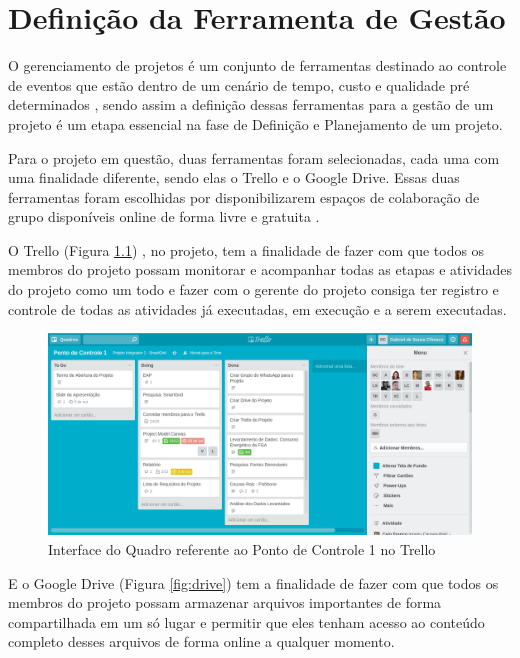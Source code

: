 \chapter[Definição da Ferramenta de Gestão]{Definição da Ferramenta de Gestão}

O gerenciamento de projetos é um conjunto de ferramentas destinado ao controle de eventos que estão dentro de um cenário de tempo, custo e qualidade pré determinados \cite{vargas2016gerenciamento}, sendo assim a definição dessas ferramentas para a gestão de um projeto é um etapa essencial na fase de Definição e Planejamento de um projeto.  

Para o projeto em questão, duas ferramentas foram selecionadas, cada uma com uma finalidade diferente, sendo elas o Trello e o Google Drive. Essas duas ferramentas foram escolhidas por disponibilizarem espaços de colaboração de grupo disponíveis online de forma livre e gratuita \cite{paulus2013digital}. 

O Trello (Figura \ref{fig:trello}) , no projeto, tem a finalidade de fazer com que todos os membros do projeto possam monitorar e acompanhar todas as etapas e atividades do projeto como um todo e fazer com o gerente do projeto consiga ter registro e controle de todas as atividades já executadas, em execução e a serem executadas.

\begin{figure}[!h]
	\centering
	\includegraphics[width=\textwidth]{figuras/trello.png}
	\caption{Interface do Quadro referente ao Ponto de Controle 1 no Trello}
	\label{fig:trello}
\end{figure}

E o Google Drive (Figura \ref{fig:drive}) tem a finalidade de fazer com que todos os membros do projeto possam armazenar arquivos importantes de forma compartilhada em um só lugar e permitir que eles tenham acesso ao conteúdo completo desses arquivos de forma online a qualquer momento.

